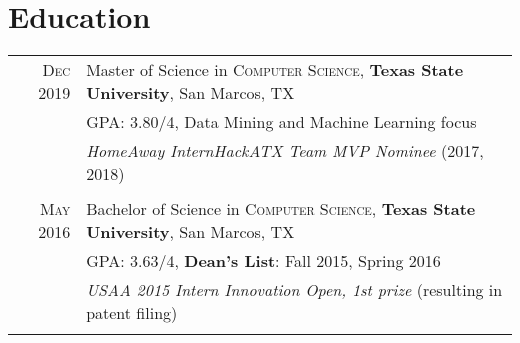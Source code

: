 \documentclass[a4paper,10pt]{article}
\begin{document}
\section{Education}
\begin{tabular}{rl}	
	\textsc{Dec} 2019 & Master of Science in \textsc{Computer Science}, \textbf{Texas State University}, San Marcos, TX\\
	
	&\normalsize \textsc{GPA}: 3.80/4, Data Mining and Machine Learning focus \\ 
	
	& \emph{HomeAway InternHackATX Team MVP Nominee} (2017, 2018) \\
	
	& \\
	
	\textsc{May} 2016 & Bachelor of Science in \textsc{Computer Science}, \textbf{Texas State University}, San Marcos, TX \\
	
	&\normalsize \textsc{GPA}: 3.63/4,  \textbf{Dean’s List}: Fall 2015, Spring 2016 \\
	
	& \emph{USAA 2015 Intern Innovation Open, 1st prize} (resulting in patent filing)  \\
	
	& \\
\end{tabular}

\end{document}
